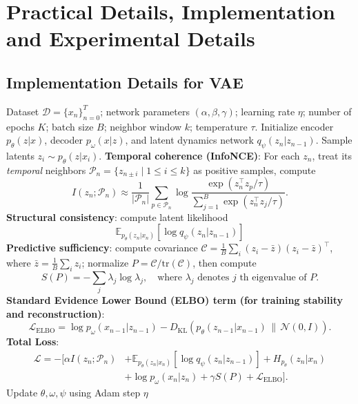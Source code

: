 \documentclass{article} %
\begin{document}
\clearpage
\section{Practical Details, Implementation and Experimental Details} \label{append:experiements}



\subsection{Implementation Details for VAE} \label{pesudocode:vae}

\begin{algorithm}
\caption{Information-Theoretic Koopman Representation (VAE, probabilistic)}
\begin{algorithmic}[1]
\REQUIRE Dataset $\mathcal{D}=\{x_n\}_{n=0}^T$; network parameters $(\alpha,\beta,\gamma)$; learning rate $\eta$; number of epochs $K$; batch size $B$; neighbor window $k$; temperature $\tau$.
\STATE Initialize encoder $p_\theta(z|x)$, decoder $p_\omega(x|z)$, and latent dynamics network $q_\psi(z_n|z_{n-1})$.
        \STATE Sample latents $z_i \sim p_\theta(z|x_i)$.
        \STATE \textbf{Temporal coherence (InfoNCE)}: 
        For each $z_n$, treat its \textit{temporal} neighbors 
        $\mathcal P_n=\{z_{n\pm i}\mid 1\le i\le k\}$ as positive samples, 
        compute
        \[
        I(z_n;\mathcal P_n)\approx \frac{1}{|\mathcal P_n|}\sum_{p\in\mathcal P_n}
        \log \frac{\exp(z_n^\top z_p/\tau)}{\sum_{j=1}^B \exp(z_n^\top z_j/\tau)} .
        \]
        \STATE \textbf{Structural consistency}: compute latent likelihood
        \[
        \mathbb{E}_{p_\theta(z_n | x_n)}[\log q_\psi(z_n | z_{n-1})]
        \]
        \STATE \textbf{Predictive sufficiency}: compute covariance 
        $\mathcal{C}=\tfrac{1}{B}\sum_i(z_i-\bar z)(z_i-\bar z)^\top$, where $\bar z=\frac{1}{B}\sum_iz_i$;
        normalize $P=\mathcal{C}/\mathrm{tr}(\mathcal{C})$, 
        then compute 
        \[
        S(P)=-\sum_j \lambda_j\log\lambda_j, \quad 
        \text{where $\lambda_j$ denotes $j$ th eigenvalue of $P$}.
        \]
        \STATE \textbf{Standard Evidence Lower Bound (ELBO) term (for training stability and reconstruction)}:
        \[
        \mathcal L_\text{ELBO} = \log p_\omega(x_{n-1}|z_{n-1}) - D_{\mathrm{KL}}\!\left(p_\theta(z_{n-1}|x_{n-1})\,\|\, \mathcal N(0,I)\right).
        \]
        \STATE \textbf{Total Loss}: 
        \begin{align*}
            \mathcal L  = -\Big[ \alpha I(z_n;\mathcal P_n)  & + 
           \mathbb{E}_{p_\theta(z_n | x_n)}[\log q_\psi(z_n | z_{n-1})]   + H_{p_\theta}(z_n | x_n) \\
            & + \log p_\omega(x_n|z_n)
            + \gamma S(P) + \mathcal L_\text{ELBO} \Big].
        \end{align*}
        \STATE Update $\theta,\omega,\psi$ using Adam step $\eta$
    \ENDFOR
\ENDFOR
\end{algorithmic}
\end{algorithm}
\end{document}
